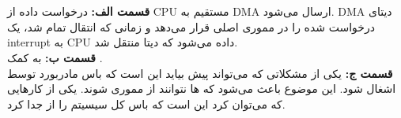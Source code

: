 ~\\
\\\textbf{قسمت الف:}
درخواست داده از
CPU
مستقیم به
DMA
ارسال می‌شود.
DMA
دیتای درخواست شده را در مموری اصلی قرار می‌دهد و زمانی که انتقال تمام شد، یک
interrupt
به
CPU
داده می‌شود که دیتا منتقل شد.
\\\textbf{قسمت ب:}
به کمک
.
\\\textbf{قسمت ج:}
یکی از مشکلاتی که می‌تواند پیش بیاید این است که باس مادربورد توسط
اشغال شود. این موضوع باعث می‌شود که
ها
نتوانند از مموری
شوند. یکی از کار‌هایی که می‌توان کرد این است که باس کل سیسیتم را از
جدا کرد.